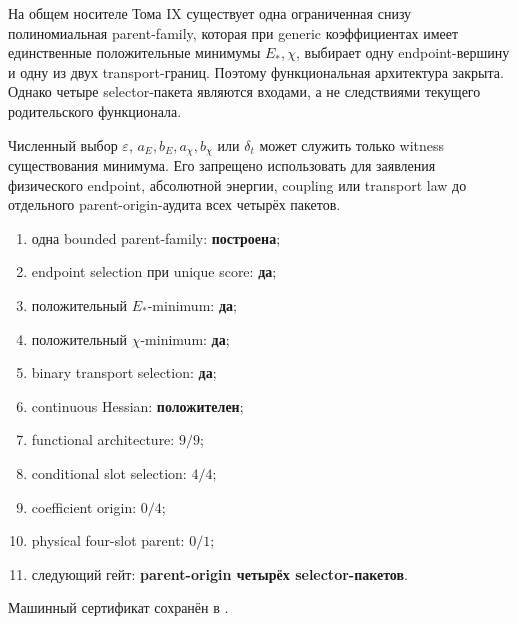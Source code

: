 \begin{theorem}
На общем носителе Тома IX существует одна ограниченная снизу полиномиальная
parent-family, которая при generic коэффициентах имеет единственные
положительные минимумы $E_*,\chi$, выбирает одну endpoint-вершину и одну из
двух transport-границ. Поэтому функциональная архитектура закрыта. Однако
четыре selector-пакета являются входами, а не следствиями текущего родительского функционала.
\end{theorem}

\begin{nogocriterion}
Численный выбор $\varepsilon$, $a_E,b_E,a_\chi,b_\chi$ или $\delta_t$ может
служить только witness существования минимума. Его запрещено использовать
для заявления физического endpoint, абсолютной энергии, coupling или
transport law до отдельного parent-origin-аудита всех четырёх пакетов.
\end{nogocriterion}

\begin{protocol}\begin{enumerate}
\item одна bounded parent-family: \textbf{построена};
\item endpoint selection при unique score: \textbf{да};
\item положительный $E_*$-minimum: \textbf{да};
\item положительный $\chi$-minimum: \textbf{да};
\item binary transport selection: \textbf{да};
\item continuous Hessian: \textbf{положителен};
\item functional architecture: \textbf{$9/9$};
\item conditional slot selection: \textbf{$4/4$};
\item coefficient origin: \textbf{$0/4$};
\item physical four-slot parent: \textbf{$0/1$};
\item следующий гейт: \textbf{parent-origin четырёх selector-пакетов}.
\end{enumerate}\end{protocol}

Машинный сертификат сохранён в
.